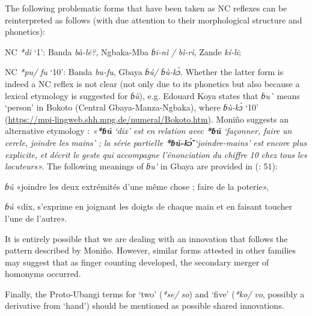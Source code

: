 The following problematic forms that have been taken as NC reflexes can be reinterpreted as follows (with due attention to their morphological structure and phonetics):

NC \textit{*di} ‘1’: Banda \textit{bà-l{\={e}}?,} Ngbaka-Mba \textit{ɓ{\={i}}-nì} \textit{/} \textit{bì-rì}, Zande \textit{kí-l{\={i}}};

NC \textit{*pu/} \textit{fu} ‘10’: Banda \textit{bu-fu}, Gbaya \textit{ɓ{\'{u}}/} \textit{ɓ{\`{u}}-k{\`{ɔ}}}. Whether the latter form is indeed a NC reflex is not clear (not only due to its phonetics but also because a lexical etymology is suggested for \textit{ɓ{\`{u}}}), e.g. Edouard Koya states that \textit{ɓu{\`{}}} means ‘person’ in Bokoto (Central Gbaya-Manza-Ngbaka), where \textit{ɓ{\`{u}}-k{\`{ɔ}}} ‘10’ (\url{https://mpi-lingweb.shh.mpg.de/numeral/Bokoto.htm}). Moniño suggests an alternative etymology \citep[656]{Moñino1995}: \textit{«}\textbf{\textit{*ɓ{\'{u}}} }\textit{‘dix’} \textit{est} \textit{en} \textit{relation} \textit{avec} \textbf{\textit{*ɓ{\'{u}}}} \textit{‘façonner,} \textit{faire} \textit{un} \textit{cercle,} \textit{joindre} \textit{les} \textit{mains’} \textit{;} \textit{la} \textit{série} \textit{partielle} \textbf{\textit{*ɓ{\'{u}}-k{\'{\~ɔ}}}} \textit{‘joindre-mains’} \textit{est} \textit{encore} \textit{plus} \textit{explicite,} \textit{et} \textit{décrit} \textit{le} \textit{geste} \textit{qui} \textit{accompagne} \textit{l’énonciation} \textit{du} \textit{chiffre} \textit{10} \textit{chez} \textit{tous} \textit{les} \textit{locuteurs».} The following meanings of \textit{ɓu}\textit{\'{}} in Gbaya are provided in (\citealt{BlanchardNoss1982}: 51): 

\textit{ɓ{\'{u}}}  «joindre les deux extrémités d’une même chose ; faire de la poterie», 

\textit{ɓ{\'{u}}} «dix, s’exprime en joignant les doigts de chaque main et en faisant toucher l’une de l’autre». 

It is entirely possible that we are dealing with an innovation that follows the pattern described by Moniño. However, similar forms attested in other families may suggest that as finger counting developed, the secondary merger of homonyms occurred.

Finally, the Proto-Ubangi terms for ‘two’ (\textit{*se}\textit{/} \textit{so}) and ‘five’ (\textit{*ko}\textit{/} \textit{vo}, possibly a derivative from ‘hand’) should be mentioned as possible shared innovations. 

